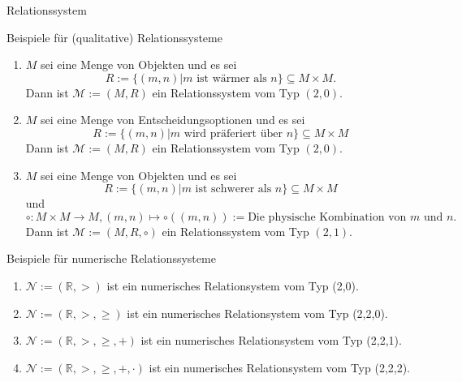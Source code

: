 \documentclass[
  8pt,
  ignorenonframetext,
]{beamer}
\providecommand{\tightlist}{%
  \setlength{\itemsep}{0pt}\setlength{\parskip}{0pt}}
\begin{document}
\begin{frame}{Relationssystem}
\protect\hypertarget{relationssystem}{}
\vspace{2mm}
\small

Beispiele für (qualitative) Relationssysteme \footnotesize

\begin{enumerate}
[(1)]
\item
  \(M\) sei eine Menge von Objekten und es sei \begin{equation}
  R := \{(m,n)| m \mbox{ ist wärmer als } n\} \subseteq  M\times M.
  \end{equation} Dann ist \(\mathcal{M} := (M,R)\) ein Relationssystem
  vom Typ \((2,0)\).
\item
  \(M\) sei eine Menge von Entscheidungsoptionen und es sei
  \begin{equation}
  R := \{(m,n)| m \mbox{ wird präferiert über } n\} \subseteq  M\times M
  \end{equation} Dann ist \(\mathcal{M} := (M,R)\) ein Relationssystem
  vom Typ \((2,0)\).
\item
  \(M\) sei eine Menge von Objekten und es sei \begin{equation}
  R := \{(m,n)| m \mbox{ ist schwerer als } n\} \subseteq  M\times M
  \end{equation} und \begin{equation}
  \circ : M \times M \to M, (m,n) \mapsto \circ((m,n)) := \mbox{Die physische Kombination von } m \mbox{ und } n.
  \end{equation} Dann ist \(\mathcal{M} := (M,R,\circ)\) ein
  Relationssystem vom Typ \((2,1)\).
\end{enumerate}

\small

Beispiele für numerische Relationssysteme \footnotesize

\begin{enumerate}
[(1)]
\tightlist
\item
  \(\mathcal{N} := (\mathbb{R},>)\) ist ein numerisches Relationsystem
  vom Typ (2,0).
\item
  \(\mathcal{N} := (\mathbb{R},>,\ge)\) ist ein numerisches
  Relationsystem vom Typ (2,2,0).
\item
  \(\mathcal{N} := (\mathbb{R},>,\ge, +)\) ist ein numerisches
  Relationsystem vom Typ (2,2,1).
\item
  \(\mathcal{N} := (\mathbb{R},>,\ge, +, \cdot)\) ist ein numerisches
  Relationsystem vom Typ (2,2,2).
\end{enumerate}
\end{frame}
\end{document}
